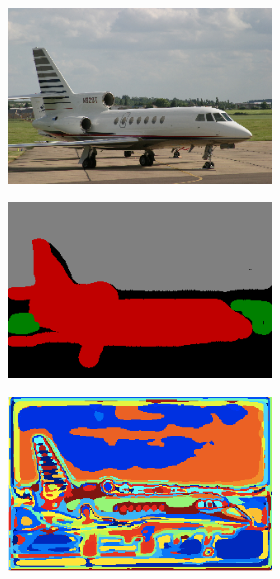 \documentclass{article} %
\begin{document}
\begin{figure}
	\begin{subfigure}[c]{\textwidth}
		\centering
		\begin{subfigure}[c]{0.195\textwidth}
			\includegraphics[width = \textwidth]{./img/4_1_s.png}
			\label{fig:4_1_s}
		\end{subfigure}
		\begin{subfigure}[c]{0.195\textwidth}
			\includegraphics[width = \textwidth]{./img/4_1_s_GT.png}
			\label{fig:4_1_s_lab}
		\end{subfigure}
		\begin{subfigure}[c]{0.195\textwidth}
			\includegraphics[width = \textwidth]{./img/4_1_s_map.png}

\end{subfigure}
\end{subfigure}
\end{figure}
\end{document}
